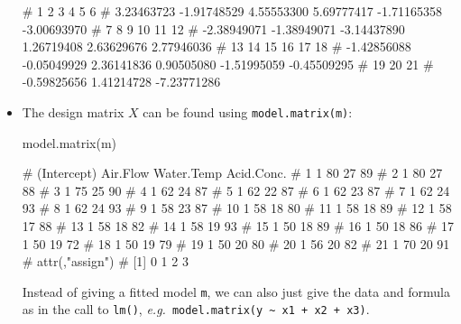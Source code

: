 \documentclass[
  a4paper,
]{article}
\newenvironment{Shaded}{\begin{snugshade}}{\end{snugshade}}
\newcommand{\FunctionTok}[1]{\textcolor[rgb]{0.00,0.00,0.00}{#1}}
\newcommand{\NormalTok}[1]{#1}
\theoremstyle{definition}
\theoremstyle{definition}
\theoremstyle{definition}
\theoremstyle{definition}
\theoremstyle{remark}
\begin{document}
\begin{itemize}
\begin{Shaded}
\begin{Highlighting}[]
\NormalTok{\#           1           2           3           4           5           6 }
\NormalTok{\#  3.23463723 {-}1.91748529  4.55553300  5.69777417 {-}1.71165358 {-}3.00693970 }
\NormalTok{\#           7           8           9          10          11          12 }
\NormalTok{\# {-}2.38949071 {-}1.38949071 {-}3.14437890  1.26719408  2.63629676  2.77946036 }
\NormalTok{\#          13          14          15          16          17          18 }
\NormalTok{\# {-}1.42856088 {-}0.05049929  2.36141836  0.90505080 {-}1.51995059 {-}0.45509295 }
\NormalTok{\#          19          20          21 }
\NormalTok{\# {-}0.59825656  1.41214728 {-}7.23771286}
\end{Highlighting}
\end{Shaded}
\item
  The design matrix \(X\) can be found using \texttt{model.matrix(m)}:

\begin{Shaded}
\begin{Highlighting}[]
  \FunctionTok{model.matrix}\NormalTok{(m)}
\end{Highlighting}
\end{Shaded}

\begin{Shaded}
\begin{Highlighting}[]
\NormalTok{\#    (Intercept) Air.Flow Water.Temp Acid.Conc.}
\NormalTok{\# 1            1       80         27         89}
\NormalTok{\# 2            1       80         27         88}
\NormalTok{\# 3            1       75         25         90}
\NormalTok{\# 4            1       62         24         87}
\NormalTok{\# 5            1       62         22         87}
\NormalTok{\# 6            1       62         23         87}
\NormalTok{\# 7            1       62         24         93}
\NormalTok{\# 8            1       62         24         93}
\NormalTok{\# 9            1       58         23         87}
\NormalTok{\# 10           1       58         18         80}
\NormalTok{\# 11           1       58         18         89}
\NormalTok{\# 12           1       58         17         88}
\NormalTok{\# 13           1       58         18         82}
\NormalTok{\# 14           1       58         19         93}
\NormalTok{\# 15           1       50         18         89}
\NormalTok{\# 16           1       50         18         86}
\NormalTok{\# 17           1       50         19         72}
\NormalTok{\# 18           1       50         19         79}
\NormalTok{\# 19           1       50         20         80}
\NormalTok{\# 20           1       56         20         82}
\NormalTok{\# 21           1       70         20         91}
\NormalTok{\# attr(,"assign")}
\NormalTok{\# [1] 0 1 2 3}
\end{Highlighting}
\end{Shaded}

  Instead of giving a fitted model \texttt{m}, we can also just give the
  data and formula as in the call to \texttt{lm()},
  \emph{e.g.}~\texttt{model.matrix(y\ \textasciitilde{}\ x1\ +\ x2\ +\ x3)}.
\end{itemize}
\end{document}
